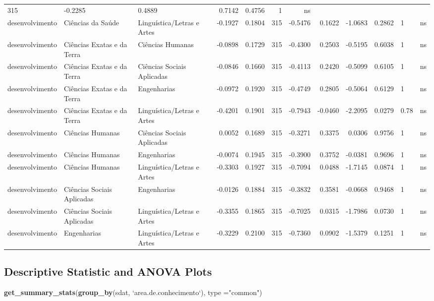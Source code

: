 \documentclass[]{article}
\newenvironment{Shaded}{\begin{snugshade}}{\end{snugshade}}
\newcommand{\DataTypeTok}[1]{\textcolor[rgb]{0.13,0.29,0.53}{#1}}
\newcommand{\KeywordTok}[1]{\textcolor[rgb]{0.13,0.29,0.53}{\textbf{#1}}}
\newcommand{\NormalTok}[1]{#1}
\newcommand{\StringTok}[1]{\textcolor[rgb]{0.31,0.60,0.02}{#1}}
\begin{document}
\begin{longtable}[]{@{}lllrrrrrrrll@{}}
315 & -0.2285 & 0.4889 & 0.7142 & 0.4756 & 1 & ns\tabularnewline
desenvolvimento & Ciências da Saúde & Linguística/Letras e Artes &
-0.1927 & 0.1804 & 315 & -0.5476 & 0.1622 & -1.0683 & 0.2862 & 1 &
ns\tabularnewline
desenvolvimento & Ciências Exatas e da Terra & Ciências Humanas &
-0.0898 & 0.1729 & 315 & -0.4300 & 0.2503 & -0.5195 & 0.6038 & 1 &
ns\tabularnewline
desenvolvimento & Ciências Exatas e da Terra & Ciências Sociais
Aplicadas & -0.0846 & 0.1660 & 315 & -0.4113 & 0.2420 & -0.5099 & 0.6105
& 1 & ns\tabularnewline
desenvolvimento & Ciências Exatas e da Terra & Engenharias & -0.0972 &
0.1920 & 315 & -0.4749 & 0.2805 & -0.5064 & 0.6129 & 1 &
ns\tabularnewline
desenvolvimento & Ciências Exatas e da Terra & Linguística/Letras e
Artes & -0.4201 & 0.1901 & 315 & -0.7943 & -0.0460 & -2.2095 & 0.0279 &
0.78 & ns\tabularnewline
desenvolvimento & Ciências Humanas & Ciências Sociais Aplicadas & 0.0052
& 0.1689 & 315 & -0.3271 & 0.3375 & 0.0306 & 0.9756 & 1 &
ns\tabularnewline
desenvolvimento & Ciências Humanas & Engenharias & -0.0074 & 0.1945 &
315 & -0.3900 & 0.3752 & -0.0381 & 0.9696 & 1 & ns\tabularnewline
desenvolvimento & Ciências Humanas & Linguística/Letras e Artes &
-0.3303 & 0.1927 & 315 & -0.7094 & 0.0488 & -1.7145 & 0.0874 & 1 &
ns\tabularnewline
desenvolvimento & Ciências Sociais Aplicadas & Engenharias & -0.0126 &
0.1884 & 315 & -0.3832 & 0.3581 & -0.0668 & 0.9468 & 1 &
ns\tabularnewline
desenvolvimento & Ciências Sociais Aplicadas & Linguística/Letras e
Artes & -0.3355 & 0.1865 & 315 & -0.7025 & 0.0315 & -1.7986 & 0.0730 & 1
& ns\tabularnewline
desenvolvimento & Engenharias & Linguística/Letras e Artes & -0.3229 &
0.2100 & 315 & -0.7360 & 0.0902 & -1.5379 & 0.1251 & 1 &
ns\tabularnewline
\bottomrule
\end{longtable}

\hypertarget{descriptive-statistic-and-anova-plots}{%
\subsection{Descriptive Statistic and ANOVA
Plots}\label{descriptive-statistic-and-anova-plots}}

\begin{Shaded}
\begin{Highlighting}[]
\KeywordTok{get_summary_stats}\NormalTok{(}\KeywordTok{group_by}\NormalTok{(sdat, }\StringTok{`}\DataTypeTok{area.de.conhecimento}\StringTok{`}\NormalTok{), }\DataTypeTok{type =}\StringTok{"common"}\NormalTok{)}
\end{Highlighting}
\end{Shaded}
\end{document}
